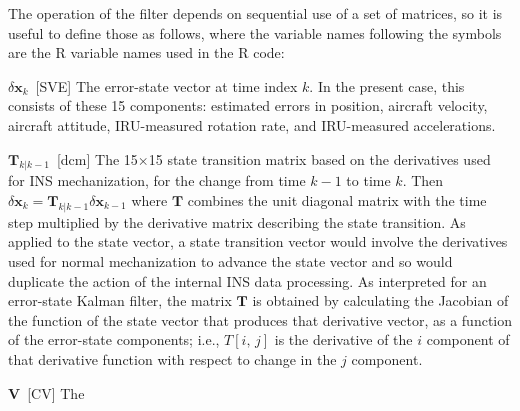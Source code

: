 \documentclass[12pt,twoside,english,12pt,twoside,english]{article}\usepackage[]{graphicx}\usepackage[]{color}
\newenvironment{lyxlist}[1]
{\begin{list}{}
{\settowidth{\labelwidth}{#1}
 \setlength{\leftmargin}{\labelwidth}
 \addtolength{\leftmargin}{\labelsep}
 \renewcommand{\makelabel}[1]{##1\hfil}}}
{\end{list}}
\let\OrgIndex\index
\renewcommand*{\index}[1]{\OrgIndex{#1}}
\begin{document}
The operation of the filter depends
on sequential use of a set of matrices, so it is useful to define
those as follows, where the variable names following the symbols are
the R variable names used in the
R code:
\begin{lyxlist}{00.00.0000}
\item [{$\delta\mathbf{x}_{k}$~{[}SVE{]}}] The
error-state vector
at time index $k$. In the present case, this consists of these 15
components: estimated errors in
position, aircraft velocity, aircraft
attitude, IRU-measured
rotation rate, and IRU-measured
accelerations. 
\item [{$\mathbf{T}_{k|k-1}$~{[}dcm{]}}] The
15$\times$15 state transition matrix
based on the derivatives used for INS mechanization,
for the change from time $k-1$ to time $k$. Then $\delta\mathbf{x}_{k}=\mathbf{T}_{k|k-1}\delta\mathbf{x}_{k-1}$
where $\mathbf{T}$ combines the unit diagonal matrix with the time
step multiplied by the derivative
 matrix describing the state transition. As applied to the state vector,
a state transition vector would involve the derivatives used for normal
mechanization to advance the state vector and so would duplicate the
action of the internal INS data processing. As interpreted for an
error-state Kalman filter, the matrix
$\mathbf{T}$ is obtained by calculating the Jacobian of the function
of the state vector that produces that derivative
vector, as a function of the error-state components;
i.e., $T[i,\,j]$ is the derivative of the $i$ component of that
derivative function with respect to change in the $j$ component.
\item [{$\mathbf{V}$~{[}CV{]}}] The

\end{lyxlist}
\end{document}
